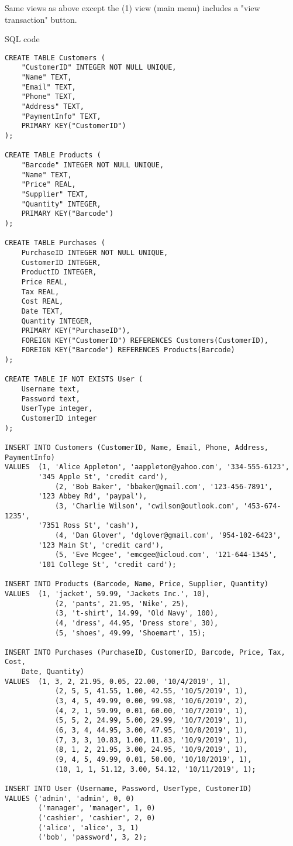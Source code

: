 \documentclass[notitlepage,11pt]{article}
\begin{document}
	Same views as above except the (1) view (main menu) includes a "view transaction" button.
\newpage
\begin{center} SQL code \end{center}
\Suppressnumber
\begin{lstlisting}
CREATE TABLE Customers (
	"CustomerID" INTEGER NOT NULL UNIQUE,
	"Name" TEXT,
	"Email" TEXT,
	"Phone" TEXT,
	"Address" TEXT,
	"PaymentInfo" TEXT,
	PRIMARY KEY("CustomerID")
);

CREATE TABLE Products (
	"Barcode" INTEGER NOT NULL UNIQUE,
	"Name" TEXT,
	"Price" REAL,
	"Supplier" TEXT,
	"Quantity" INTEGER,
	PRIMARY KEY("Barcode")
);

CREATE TABLE Purchases (
	PurchaseID INTEGER NOT NULL UNIQUE,
	CustomerID INTEGER,
	ProductID INTEGER,
	Price REAL,
	Tax REAL,
	Cost REAL,
	Date TEXT,
	Quantity INTEGER,
	PRIMARY KEY("PurchaseID"),
	FOREIGN KEY("CustomerID") REFERENCES Customers(CustomerID),
	FOREIGN KEY("Barcode") REFERENCES Products(Barcode)
);

CREATE TABLE IF NOT EXISTS User (
	Username text,
	Password text,
	UserType integer,
	CustomerID integer
);

INSERT INTO Customers (CustomerID, Name, Email, Phone, Address, PaymentInfo)
VALUES	(1, 'Alice Appleton', 'aappleton@yahoo.com', '334-555-6123', 
		'345 Apple St', 'credit card'),
			(2, 'Bob Baker', 'bbaker@gmail.com', '123-456-7891', 
		'123 Abbey Rd', 'paypal'),
			(3, 'Charlie Wilson', 'cwilson@outlook.com', '453-674-1235', 
		'7351 Ross St', 'cash'),
			(4, 'Dan Glover', 'dglover@gmail.com', '954-102-6423', 
		'123 Main St', 'credit card'),
			(5, 'Eve Mcgee', 'emcgee@icloud.com', '121-644-1345', 
		'101 College St', 'credit card');

INSERT INTO Products (Barcode, Name, Price, Supplier, Quantity)
VALUES	(1, 'jacket', 59.99, 'Jackets Inc.', 10),
			(2, 'pants', 21.95, 'Nike', 25),
			(3, 't-shirt', 14.99, 'Old Navy', 100),
			(4, 'dress', 44.95, 'Dress store', 30),
			(5, 'shoes', 49.99, 'Shoemart', 15);

INSERT INTO Purchases (PurchaseID, CustomerID, Barcode, Price, Tax, Cost, 
	Date, Quantity)
VALUES	(1, 3, 2, 21.95, 0.05, 22.00, '10/4/2019', 1),
			(2, 5, 5, 41.55, 1.00, 42.55, '10/5/2019', 1),
			(3, 4, 5, 49.99, 0.00, 99.98, '10/6/2019', 2),
			(4, 2, 1, 59.99, 0.01, 60.00, '10/7/2019', 1),
			(5, 5, 2, 24.99, 5.00, 29.99, '10/7/2019', 1),
			(6, 3, 4, 44.95, 3.00, 47.95, '10/8/2019', 1),
			(7, 3, 3, 10.83, 1.00, 11.83, '10/9/2019', 1),
			(8, 1, 2, 21.95, 3.00, 24.95, '10/9/2019', 1),
			(9, 4, 5, 49.99, 0.01, 50.00, '10/10/2019', 1),
			(10, 1, 1, 51.12, 3.00, 54.12, '10/11/2019', 1);
			
INSERT INTO User (Username, Password, UserType, CustomerID) 
VALUES ('admin', 'admin', 0, 0)
		('manager', 'manager', 1, 0)
		('cashier', 'cashier', 2, 0)
		('alice', 'alice', 3, 1)
		('bob', 'password', 3, 2);

\end{lstlisting}
\end{document}

